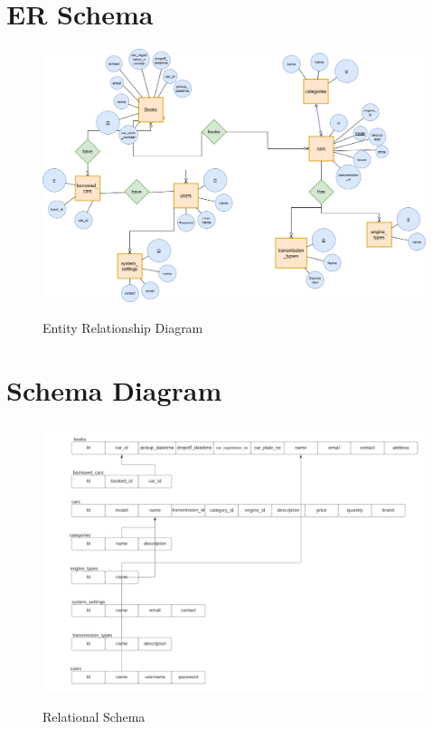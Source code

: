 \section{ER Schema}
\begin{figure}[H]
\centering
\caption{Entity Relationship Diagram}
\includegraphics[width=\textwidth,height=\textheight,keepaspectratio]{./ER.png}
\\[0.2in]
\label{fig:Entitiy Relationship Diagram}
\end{figure}

\pagebreak
\thispagestyle{fancy}

\section{Schema Diagram}
\begin{figure}[H]
\centering
\caption{Relational Schema}
\includegraphics[scale=.65]{./Schema.png}
\\[0.2in]
\label{fig:Relational Schema}
\end{figure}

\thispagestyle{fancy}
